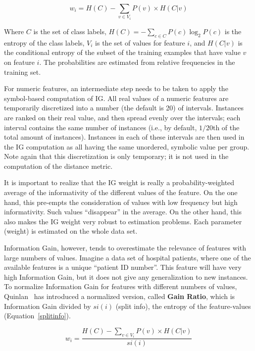 \documentclass{book}
\begin{document}
\begin{equation}
w_{i} = H(C) -  \sum_{v \in V_{i}} P(v) \times H(C|v)
\label{IGgain}
\end{equation}

Where $C$ is the set of class labels, $H(C) = - \sum_{c \in C} P(c)
\log_{2} P(c)$ is the entropy of the class labels, $V_{i}$ is the set
of values for feature $i$, and $H(C|v)$ is the conditional entropy of
the subset of the training examples that have value $v$ on feature
$i$. The probabilities are estimated from relative frequencies in the
training set.

For numeric features, an intermediate step needs to be taken to apply
the symbol-based computation of IG. All real values of a numeric
features are temporarily discretized into a number (the default is 20)
of intervals. Instances are ranked on their real value, and then
spread evenly over the intervals; each interval contains the same
number of instances (i.e., by default, $1/20$th of the total amount of
instances). Instances in each of these intervals are then used in the
IG computation as all having the same unordered, symbolic value per
group. Note again that this discretization is only temporary; it is
not used in the computation of the distance metric.

It is important to realize that the IG weight is really a
probability-weighted average of the informativity of the different
values of the feature. On the one hand, this pre-empts the
consideration of values with low frequency but high
informativity. Such values ``disappear'' in the average. On the other
hand, this also makes the IG weight very robust to estimation
problems. Each parameter (weight) is estimated on the whole data set.

Information Gain, however, tends to overestimate the relevance of
features with large numbers of values. Imagine a data set of hospital
patients, where one of the available features is a unique ``patient ID
number''. This feature will have very high Information Gain, but it
does not give any generalization to new instances. To normalize
Information Gain for features with different numbers of values,
Quinlan~\cite{Quinlan93} has introduced a normalized version, called
{\bf Gain Ratio}, which is Information Gain divided by $si(i)$ (split info),
the entropy of the feature-values (Equation~\ref{splitinfo}).

\begin{equation}
w_{i} = \frac{H(C) -  \sum_{v \in V_{i}} P(v) \times H(C|v)}{si(i)}
\label{IGgainratio}
\end{equation}
\end{document}
